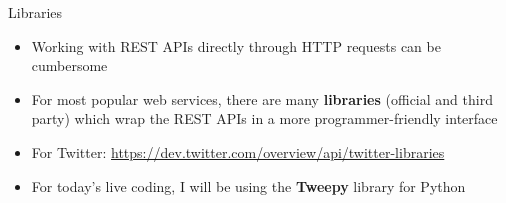 \begin{frame}{Libraries}
    \begin{itemize}
        \item Working with REST APIs directly through HTTP requests can be cumbersome \pause
        \item For most popular web services, there are many \textbf{libraries} (official and third party)
            which wrap the REST APIs in a more programmer-friendly interface \pause
        \item For Twitter: \url{https://dev.twitter.com/overview/api/twitter-libraries} \pause
        \item For today's live coding, I will be using the \textbf{Tweepy} library for Python
    \end{itemize}
\end{frame}

